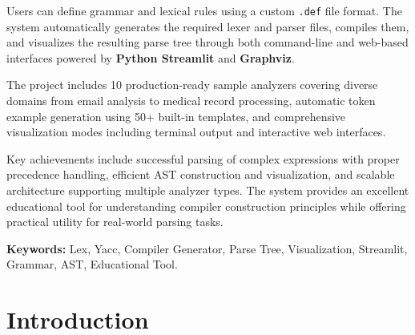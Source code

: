 \documentclass[a4paper,12pt]{report}
\begin{document}
\par
Users can define grammar and lexical rules using a custom \texttt{.def} file format. The system automatically generates the required lexer and parser files, compiles them, and visualizes the resulting parse tree through both command-line and web-based interfaces powered by \textbf{Python Streamlit} and \textbf{Graphviz}.

The project includes 10 production-ready sample analyzers covering diverse domains from email analysis to medical record processing, automatic token example generation using 50+ built-in templates, and comprehensive visualization modes including terminal output and interactive web interfaces.

Key achievements include successful parsing of complex expressions with proper precedence handling, efficient AST construction and visualization, and scalable architecture supporting multiple analyzer types. The system provides an excellent educational tool for understanding compiler construction principles while offering practical utility for real-world parsing tasks.

\par
\textbf{Keywords:} Lex, Yacc, Compiler Generator, Parse Tree, Visualization, Streamlit, Grammar, AST, Educational Tool.

\makeatletter
\let\l@table\l@figure %
\renewcommand\listoffigures{%
    \section*{\listfigurename}%
    \@mkboth{\MakeUppercase\listfigurename}{\MakeUppercase\listfigurename}%
    \@starttoc{lof}%
}
\renewcommand\listoftables{%
    \section*{\listtablename}%
    \@mkboth{\MakeUppercase\listtablename}{\MakeUppercase\listtablename}%
    \@starttoc{lot}%
}
\makeatother

\newpage
{}
\tableofcontents
\listoffigures
\listoftables


\newpage
{}

\chapter{Introduction}
\thispagestyle{contentpages}
\justifying
\end{document}
